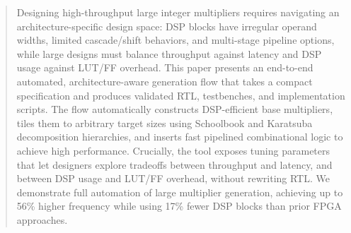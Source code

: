 \documentclass[sigconf,9pt,review]{acmart}
\newif\ifshowcompiletime
\begin{document}
\pagestyle{fancy}
\fancyhf{} %
\renewcommand{\headrulewidth}{0pt} %
\fancyfoot[C]{\thepage} %
\ifshowcompiletime
  \fancyfoot[L]{\footnotesize Compiled: \mydate\today\ at \currenttime} %
\fi


\begin{abstract}
Designing high-throughput large integer multipliers requires navigating an architecture-specific design space: DSP blocks have irregular operand widths, limited cascade/shift behaviors, and multi-stage pipeline options, while large designs must balance throughput against latency and DSP usage against LUT/FF overhead.
This paper presents an end-to-end automated, architecture-aware generation flow that takes a compact specification and produces validated RTL, testbenches, and implementation scripts.
The flow automatically constructs DSP-efficient base multipliers, tiles them to arbitrary target sizes using Schoolbook and Karatsuba decomposition hierarchies, and inserts fast pipelined combinational logic to achieve high performance.
Crucially, the tool exposes tuning parameters that let designers explore tradeoffs between throughput and latency, and between DSP usage and LUT/FF overhead, without rewriting RTL.
We demonstrate full automation of
large multiplier generation, achieving up to 56\% higher frequency while using 17\% fewer DSP blocks than prior FPGA approaches.
\end{abstract}





%
\end{document}
